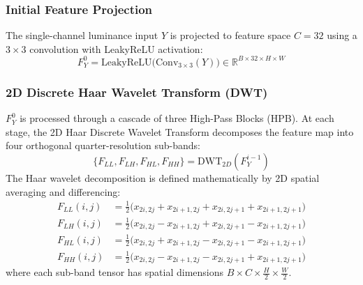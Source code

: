 \documentclass[10pt,twocolumn,letterpaper]{article}
\begin{document}
\subsubsection{Initial Feature Projection}
The single-channel luminance input $Y$ is projected to feature space $C = 32$ using a $3\times3$ convolution with LeakyReLU activation:
\begin{equation}
F_Y^0 = \text{LeakyReLU}\big( \text{Conv}_{3\times3}(Y) \big) \in \mathbb{R}^{B \times 32 \times H \times W}
\end{equation}

\subsubsection{2D Discrete Haar Wavelet Transform (DWT)}
$F_Y^0$ is processed through a cascade of three High-Pass Blocks (HPB). At each stage, the 2D Haar Discrete Wavelet Transform decomposes the feature map into four orthogonal quarter-resolution sub-bands:
\begin{equation}
\{F_{LL}, F_{LH}, F_{HL}, F_{HH}\} = \text{DWT}_{2D}(F_Y^{i-1})
\end{equation}
The Haar wavelet decomposition is defined mathematically by 2D spatial averaging and differencing:
\begin{align}
F_{LL}(i, j) &= \frac{1}{2}\big( x_{2i, 2j} + x_{2i+1, 2j} + x_{2i, 2j+1} + x_{2i+1, 2j+1} \big) \\
F_{LH}(i, j) &= \frac{1}{2}\big( x_{2i, 2j} - x_{2i+1, 2j} + x_{2i, 2j+1} - x_{2i+1, 2j+1} \big) \\
F_{HL}(i, j) &= \frac{1}{2}\big( x_{2i, 2j} + x_{2i+1, 2j} - x_{2i, 2j+1} - x_{2i+1, 2j+1} \big) \\
F_{HH}(i, j) &= \frac{1}{2}\big( x_{2i, 2j} - x_{2i+1, 2j} - x_{2i, 2j+1} + x_{2i+1, 2j+1} \big)
\end{align}
where each sub-band tensor has spatial dimensions $B \times C \times \frac{H}{2} \times \frac{W}{2}$.
\end{document}

